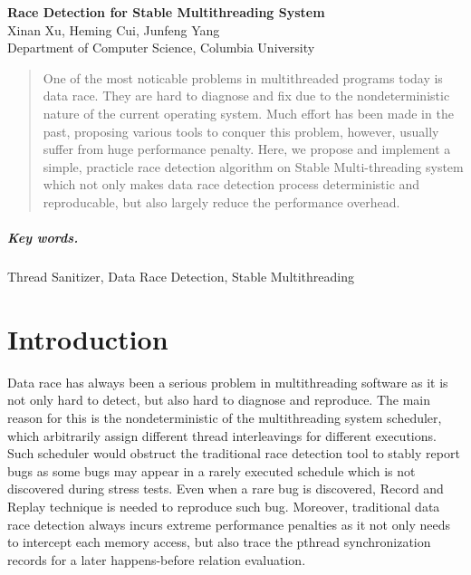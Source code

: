 
\usepackage{listings}
\usepackage{mdframed}
\usepackage{float}


\begin{center}
\textbf{\Large Race Detection for Stable Multithreading System} \\[6pt]
  Xinan Xu, Heming Cui, Junfeng Yang \\[6pt]
  Department of Computer Science,
  Columbia University
\end{center}

\begin{abstract}
One of the most noticable problems in multithreaded programs today is data race. 
They are hard to diagnose and fix due to the nondeterministic nature of the current operating system.
Much effort has been made in the past, proposing various tools to conquer this problem, however, usually
suffer from huge performance penalty. Here, we propose and implement a simple, practicle race
detection algorithm on Stable Multi-threading system which not only makes data race detection process 
deterministic and reproducable, but also largely reduce the performance overhead.
\end{abstract}

\subparagraph{Key words.} Thread Sanitizer, Data Race Detection, Stable Multithreading

\section{Introduction}
Data race has always been a serious problem in multithreading software as it is not only hard to detect,
but also hard to diagnose and reproduce. The main reason for this is the nondeterministic
of the multithreading system scheduler, which arbitrarily assign different thread interleavings for different executions.
Such scheduler would obstruct the traditional race detection tool to stably report bugs as some bugs may appear
in a rarely executed schedule which is not discovered during stress tests. Even when a rare bug is discovered, Record and Replay
technique is needed to reproduce such bug. Moreover, traditional data race detection always incurs extreme performance penalties
as it not only needs to intercept each memory access, but also trace the pthread synchronization records for a later happens-before relation evaluation.

